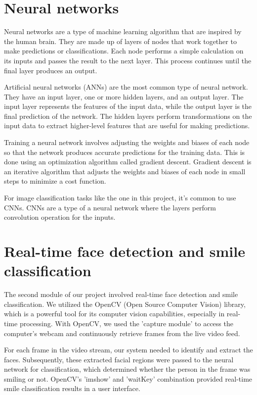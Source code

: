 \documentclass[12pt,a4paper,english
]{tunithesis}
\begin{document}
\setcounter{page}{1} 
\section{Neural networks}
Neural networks are a type of machine learning algorithm that are inspired by the human brain. They are made up of layers of nodes that work together to make predictions or classifications. Each node performs a simple calculation on its inputs and passes the result to the next layer. This process continues until the final layer produces an output.

Artificial neural networks (ANNs) are the most common type of neural network. They have an input layer, one or more hidden layers, and an output layer. The input layer represents the features of the input data, while the output layer is the final prediction of the network. The hidden layers perform transformations on the input data to extract higher-level features that are useful for making predictions.

Training a neural network involves adjusting the weights and biases of each node so that the network produces accurate predictions for the training data. This is done using an optimization algorithm called gradient descent. Gradient descent is an iterative algorithm that adjusts the weights and biases of each node in small steps to minimize a cost function.

For image classification tasks like the one in this project, it's common to use CNNs. CNNs are a type of a neural network where the layers perform convolution operation for the inputs.~\cite{dlbook}

\section{Real-time face detection and smile classification}
The second module of our project involved real-time face detection and smile classification. We utilized the OpenCV (Open Source Computer Vision) library, which is a powerful tool for its computer vision capabilities,  especially in real-time processing. With OpenCV, we used the 'capture module' to access the computer's webcam and continuously retrieve frames from the live video feed. 

For each frame in the video stream, our system needed to identify and extract the faces. Subsequently, these extracted facial regions were passed to the neural network for classification, which determined whether the person in the frame was smiling or not. OpenCV's 'imshow' and 'waitKey' combination provided real-time smile classification results in a user interface.
\end{document}
